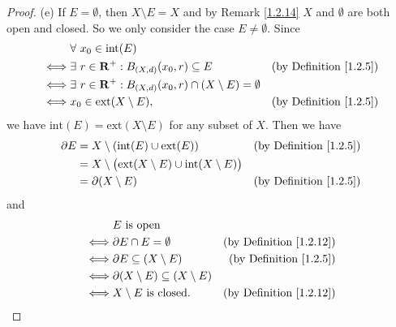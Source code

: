 \begin{proof}{(e)}
    If \(E = \emptyset\), then \(X \setminus E = X\) and by Remark \ref{1.2.14} \(X\) and \(\emptyset\) are both open and closed.
    So we only consider the case \(E \neq \emptyset\).
    Since
    \begin{align*}
             & \forall\ x_0 \in \text{int}(E)                                                                                         \\
        \iff & \exists\ r \in \mathbf{R}^+ : B_{(X, d)}(x_0, r) \subseteq E                      & \text{(by Definition \ref{1.2.5})} \\
        \iff & \exists\ r \in \mathbf{R}^+ : B_{(X, d)}(x_0, r) \cap (X \setminus E) = \emptyset                                      \\
        \iff & x_0 \in \text{ext}(X \setminus E),                                                & \text{(by Definition \ref{1.2.5})}
    \end{align*}
    we have \(\text{int}(E) = \text{ext}(X \setminus E)\) for any subset of \(X\).
    Then we have
    \begin{align*}
        \partial E & = X \setminus (\text{int}(E) \cup \text{ext}(E))                                 & \text{(by Definition \ref{1.2.5})} \\
                   & = X \setminus \big(\text{ext}(X \setminus E) \cup \text{int}(X \setminus E)\big)                                      \\
                   & = \partial (X \setminus E)                                                       & \text{(by Definition \ref{1.2.5})}
    \end{align*}
    and
    \begin{align*}
             & E \text{ is open}                                                                        \\
        \iff & \partial E \cap E = \emptyset                      & \text{(by Definition \ref{1.2.12})} \\
        \iff & \partial E \subseteq (X \setminus E)               & \text{(by Definition \ref{1.2.5})}  \\
        \iff & \partial (X \setminus E) \subseteq (X \setminus E)                                       \\
        \iff & X \setminus E \text{ is closed}.                   & \text{(by Definition \ref{1.2.12})}
    \end{align*}
\end{proof}

